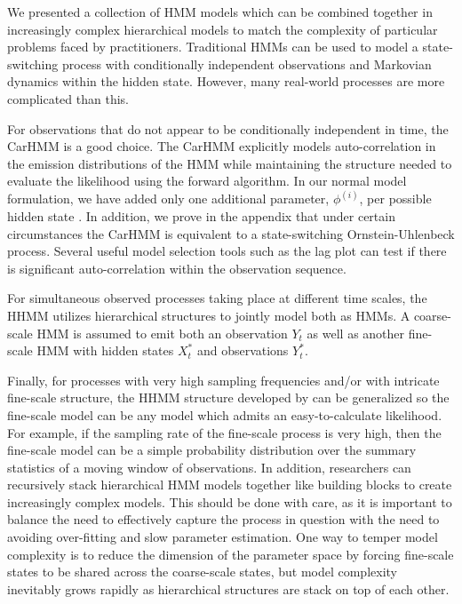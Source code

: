 

We presented a collection of HMM models which can be combined together in increasingly complex hierarchical models to match the complexity of particular problems faced by practitioners. Traditional HMMs can be used to model a state-switching process with conditionally independent observations and Markovian dynamics within the hidden state. However, many real-world processes are more complicated than this.

For observations that do not appear to be conditionally independent in time, the CarHMM is a good choice. The CarHMM explicitly models auto-correlation in the emission distributions of the HMM while maintaining the structure needed to evaluate the likelihood using the forward algorithm. In our normal model formulation, we have added only one additional parameter, $\phi^{(i)}$, per possible hidden state \citep{Lawler:2019}. In addition, we prove in the appendix that under certain circumstances the CarHMM is equivalent to a state-switching Ornstein-Uhlenbeck process. Several useful model selection tools such as the lag plot can test if there is significant auto-correlation within the observation sequence.

For simultaneous observed processes taking place at different time scales, the HHMM \citep{Barajas:2017,Adam:2019} utilizes hierarchical structures to jointly model both as HMMs. A coarse-scale HMM is assumed to emit both an observation $Y_t$ as well as another fine-scale HMM with hidden states $X^*_t$ and observations $Y^*_t$. 

Finally, for processes with very high sampling frequencies and/or with intricate fine-scale structure, the HHMM structure developed by \citep{Barajas:2017,Adam:2019} can be generalized so the fine-scale model can be any model which admits an easy-to-calculate likelihood. For example, if the sampling rate of the fine-scale process is very high, then the fine-scale model can be a simple probability distribution over the summary statistics of a moving window of observations. In addition, researchers can recursively stack hierarchical HMM models together like building blocks to create increasingly complex models. This should be done with care, as it is important to balance the need to effectively capture the process in question with the need to avoiding over-fitting and slow parameter estimation. One way to temper model complexity is to reduce the dimension of the parameter space by forcing fine-scale states to be shared across the coarse-scale states, but model complexity inevitably grows rapidly as hierarchical structures are stack on top of each other.

